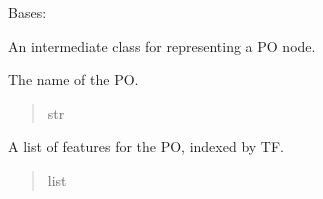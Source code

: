 \documentclass[letterpaper,10pt,english]{sphinxmanual}
\begin{document}

\begin{fulllineitems}
\label{\detokenize{nodes:nodes.nodeBuilder.PO}}
\pysigstartsignatures
\pysiglinewithargsret
{}
{\sphinxparamcomma {}\sphinxparamcomma {}\sphinxparamcomma {}}
{}
\pysigstopsignatures
\sphinxAtStartPar
Bases: {\hyperref[\detokenize{nodes:nodes.nodeBuilder.Token}]{}}

\sphinxAtStartPar
An intermediate class for representing a PO node.

\begin{fulllineitems}
\label{\detokenize{nodes:nodes.nodeBuilder.PO.name}}
\pysigstartsignatures
\pysigline
{}
\pysigstopsignatures
\sphinxAtStartPar
The name of the PO.
\begin{quote}\begin{description}
\sphinxAtStartPar
str

\end{description}\end{quote}

\end{fulllineitems}


\begin{fulllineitems}
\label{\detokenize{nodes:nodes.nodeBuilder.PO.features}}
\pysigstartsignatures
\pysigline
{}
\pysigstopsignatures
\sphinxAtStartPar
A list of features for the PO, indexed by TF.
\begin{quote}\begin{description}
\sphinxAtStartPar
list

\end{description}\end{quote}

\end{fulllineitems}


\end{fulllineitems}
\end{document}
